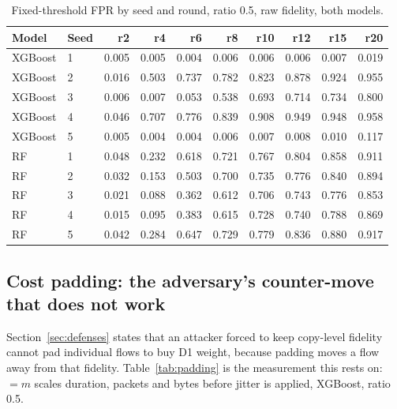 \begin{table}[t]
  \centering
  \caption{Fixed-threshold FPR by seed and round, ratio 0.5, raw fidelity, both models.}
  \label{tab:xgb-seeds-full}
  \small
  \begin{tabular}{llrrrrrrrr}
    \toprule
    Model & Seed & r2 & r4 & r6 & r8 & r10 & r12 & r15 & r20 \\
    \midrule
    XGBoost & 1 & 0.005 & 0.005 & 0.004 & 0.006 & 0.006 & 0.006 & 0.007 & 0.019 \\
    XGBoost & 2 & 0.016 & 0.503 & 0.737 & 0.782 & 0.823 & 0.878 & 0.924 & 0.955 \\
    XGBoost & 3 & 0.006 & 0.007 & 0.053 & 0.538 & 0.693 & 0.714 & 0.734 & 0.800 \\
    XGBoost & 4 & 0.046 & 0.707 & 0.776 & 0.839 & 0.908 & 0.949 & 0.948 & 0.958 \\
    XGBoost & 5 & 0.005 & 0.004 & 0.004 & 0.006 & 0.007 & 0.008 & 0.010 & 0.117 \\
    RF & 1 & 0.048 & 0.232 & 0.618 & 0.721 & 0.767 & 0.804 & 0.858 & 0.911 \\
    RF & 2 & 0.032 & 0.153 & 0.503 & 0.700 & 0.735 & 0.776 & 0.840 & 0.894 \\
    RF & 3 & 0.021 & 0.088 & 0.362 & 0.612 & 0.706 & 0.743 & 0.776 & 0.853 \\
    RF & 4 & 0.015 & 0.095 & 0.383 & 0.615 & 0.728 & 0.740 & 0.788 & 0.869 \\
    RF & 5 & 0.042 & 0.284 & 0.647 & 0.729 & 0.779 & 0.836 & 0.880 & 0.917 \\
    \bottomrule
  \end{tabular}
\end{table}

\subsection{Cost padding: the adversary's counter-move that does not work}
Section~\ref{sec:defenses} states that an attacker forced to keep copy-level fidelity cannot pad
individual flows to buy D1 weight, because padding moves a flow away from that fidelity.
Table~\ref{tab:padding} is the measurement this rests on: $=m$ scales
duration, packets and bytes before jitter is applied, XGBoost, ratio 0.5.

